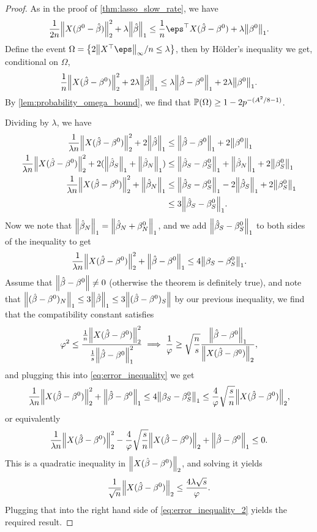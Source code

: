 \begin{proof}
	As in the proof of \cref{thm:lasso_slow_rate}, we have
	\[
	\frac1{2n} \norm{X(\beta^0 - \hat\beta)}_2^2 + \lambda \norm{\hat\beta}_1 \leq \frac1n \eps\T X(\hat\beta - \beta^0) + \lambda \norm{\beta^0}_1. 
	\]
	Define the event $\Omega = \qty{2 \norm{X\T \eps}_\infty/n \leq \lambda}$, then by H\"older's inequality we get, conditional on $\Omega$,
	\[
	\frac1n \norm{X(\hat\beta - \beta^0)}_2^2 + 2\lambda \norm{\hat\beta}_1  \leq \lambda \norm{\hat\beta - \beta^0}_1 + 2\lambda \norm{\beta^0}_1. 
	\]
	By \cref{lem:probability_omega_bound}, we find that $\mathbb P(\Omega) \geq 1 - 2p^{-(A^2/8 - 1)}$. 
	
	Dividing by $\lambda$, we have
	\begin{align*}
		\frac1{\lambda n} \norm{X(\hat\beta - \beta^0)}_2^2 + 2 \norm{\hat\beta}_1 &\leq \norm{\hat\beta - \beta^0}_1 + 2 \norm{\beta^0}_1 \\
		\frac1{\lambda n} \norm{X(\hat\beta - \beta^0)}_2^2 + 2 (\norm{\hat\beta_S}_1 + \norm{\hat\beta_N}_1) &\leq \norm{\hat\beta_S - \beta^0_S}_1 + \norm{\hat\beta_N}_1 + 2 \norm{\beta^0_S}_1\\
		\frac1{\lambda n} \norm{X(\hat\beta - \beta^0)}_2^2 +  \norm{\hat\beta_N}_1 &\leq \norm{\hat\beta_S - \beta^0_S}_1 - 2 \norm{\hat\beta_S}_1 + 2 \norm{\beta^0_S}_1 \\
		&\leq 3 \norm{\hat\beta_S - \beta^0_S}_1. 
	\end{align*}
	Now we note that $\norm{\hat\beta_N}_1 = \norm{\hat\beta_N + \beta^0_N}_1$, and we add $\norm{\hat\beta_S - \beta^0_S}_1$ to both sides of the inequality to get
	\begin{equation} \label{eq:error_inequality}
	\frac1{\lambda n} \norm{X(\hat\beta - \beta^0)}_2^2 + \norm{\hat\beta - \beta^0}_1  \leq 4 \norm{\beta_S - \beta^0_S}_1. 
	\end{equation}
	Assume that $\norm{\hat\beta - \beta^0} \neq 0$ (otherwise the theorem is definitely true), and note that $\norm{(\hat\beta - \beta^0)_N}_1 \leq 3 \norm{\hat\beta}_1 \leq 3 \norm{(\hat \beta - \beta^0)_S}$ by our previous inequality, we find that the compatibility constant satisfies
	\[
	\varphi^2 \leq \frac{\frac1n \norm{X(\hat\beta - \beta^0)}_2^2}{\frac1s \norm{\hat\beta - \beta^0}_1^2} \implies \frac1{\varphi} \geq \sqrt{\frac ns} \frac{\norm{\hat\beta - \beta^0}_1}{\norm{X(\hat\beta - \beta^0)}_2},
	\]
	and plugging this into \cref{eq:error_inequality} we get
	\begin{equation} \label{eq:error_inequality_2}
	\frac1{\lambda n} \norm{X(\hat\beta - \beta^0)}_2^2 + \norm{\hat\beta - \beta^0}_1  \leq 4 \norm{\beta_S - \beta^0_S}_1 \leq \frac4{\varphi} \sqrt{\frac sn} \norm{X(\hat\beta - \beta^0)}_2,
	\end{equation}
	or equivalently
	\[
	\frac1{\lambda n} \norm{X(\hat\beta - \beta^0)}_2^2 - \frac4{\varphi} \sqrt{\frac sn} \norm{X(\hat\beta - \beta^0)}_2 + \norm{\hat\beta - \beta^0}_1 \leq 0. 
	\]
	This is a quadratic inequality in $\norm{X(\hat\beta - \beta^0)}_2$, and solving it yields
	\[
	\frac1{\sqrt n} \norm{X(\hat\beta - \beta^0)}_2 \leq \frac{4\lambda \sqrt s}{\varphi}. 
	\] 
	Plugging that into the right hand side of \cref{eq:error_inequality_2} yields the required result. 
\end{proof}
